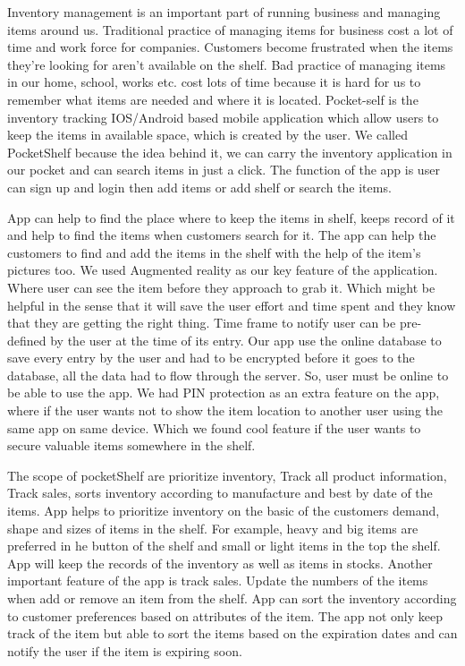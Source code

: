 
 \item Inventory management is an important part of running business and managing items around us. Traditional practice of managing items for business cost a lot of time and work force for companies. Customers become frustrated when the items they’re looking for aren’t available on the shelf. Bad practice of managing items in our home, school, works etc.  cost lots of time because it is hard for us to remember what items are needed and where it is located. Pocket-self is the inventory tracking IOS/Android based mobile application which allow users to keep the items in available space, which is created by the user. We called PocketShelf because the idea behind it, we can carry the inventory application in our pocket and can search items in just a click. The function of the app is user can sign up and login then add items or add shelf or search the items.
 
\item\item App can help to find the place where to keep the items in shelf, keeps record of it and help to find the items when customers search for it. The app can help the customers to find and add the items in the shelf with the help of the item’s pictures too. We used Augmented reality as our key feature of the application. Where user can see the item before they approach to grab it. Which might be helpful in the sense that it will save the user effort and time spent and they know that they are getting the right thing. Time frame to notify user can be pre- defined by the user at the time of its entry. Our app use the online database to save every entry by the user and had to be encrypted before it goes to the database, all the data had to flow through the server. So, user must be online to be able to use the app. We had PIN protection as an extra feature on the app, where if the user wants not to show the item location to another user using the same app on same device. Which we found cool feature if the user wants to secure valuable items somewhere in the shelf.

\item\item The scope of pocketShelf are prioritize inventory, Track all product information, Track sales, sorts inventory according to manufacture and best by date of the items. App helps to prioritize inventory on the basic of the customers demand, shape and sizes of items in the shelf. For example, heavy and big items are preferred in he button of the shelf and small or light items in the top the shelf. App will keep the records of the inventory as well as items in stocks. Another important feature of the app is track sales. Update the numbers of the items when add or remove an item from the shelf. App can sort the inventory according to customer preferences based on attributes of the item. The app not only keep track of the item but able to sort the items based on the expiration dates and can notify the user if the item is expiring soon.





